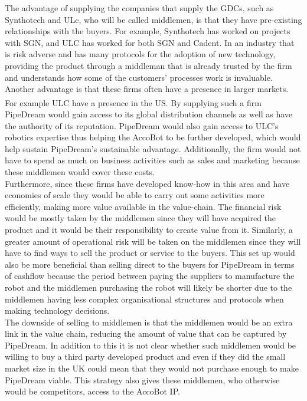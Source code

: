 \documentclass[11pt]{article}		%
\newcommand{\supercite}[1]{\textsuperscript{\cite{#1}}}		%
\begin{document}
    The advantage of supplying the companies that supply the GDCs, such as Synthotech and ULc, who will be called middlemen, is that they have pre-existing relationships with the buyers. For example, Synthotech has worked on projects with SGN, and ULC has worked for both SGN and Cadent. In an industry that is risk adverse and has many protocols for the adoption of new technology, providing the product through a middleman that is already trusted by the firm and understands how some of the customers’ processes work is invaluable. Another advantage is that these firms often have a presence in larger markets. For example ULC have a presence in the US.\supercite{SPX_acquisition} By supplying such a firm PipeDream would gain access to its global distribution channels as well as have the authority of its reputation. PipeDream would also gain access to ULC’s robotics expertise thus helping the AccoBot to be further developed, which would help sustain PipeDream's sustainable advantage. Additionally, the firm would not have to spend as much on business activities such as sales and marketing because these middlemen would cover these costs.
    \\
    \hspace*{3ex}Furthermore, since these firms have developed know-how in this area and have economies of scale they would be able to carry out some activities more efficiently, making more value available in the value-chain. The financial risk would be mostly taken by the middlemen since they will have acquired the product and it would be their responsibility to create value from it. Similarly, a greater amount of operational risk will be taken on the middlemen since they will have to find ways to sell the product or service to the buyers. This set up would also be more beneficial than selling direct to the buyers for PipeDream in terms of cashflow because the period between paying the suppliers to manufacture the robot and the middlemen purchasing the robot will likely be shorter due to the middlemen having less complex organisational structures and protocols when making technology decisions. 
    \\
    \hspace*{3ex}The downside of selling to middlemen is that the middlemen would be an extra link in the value chain, reducing the amount of value that can be captured by PipeDream. In addition to this it is not clear whether such middlemen would be willing to buy a third party developed product and even if they did the small market size in the UK could mean that they would not purchase enough to make PipeDream viable. This strategy also gives these middlemen, who otherwise would be competitors, access to the AccoBot IP.
\end{document}

